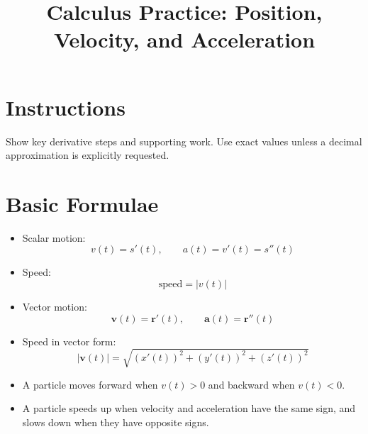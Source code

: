 \documentclass[12pt]{article}
\title{Calculus Practice: Position, Velocity, and Acceleration}
\author{}
\date{}
\begin{document}
\maketitle

\section*{Instructions}
Show key derivative steps and supporting work. Use exact values unless a decimal approximation is explicitly requested.

\section*{Basic Formulae}
\begin{itemize}[leftmargin=1.5em]
  \item Scalar motion:
  \[
  v(t)=s'(t),\qquad a(t)=v'(t)=s''(t)
  \]
  \item Speed:
  \[
  \text{speed}=|v(t)|
  \]
  \item Vector motion:
  \[
  \mathbf{v}(t)=\mathbf{r}'(t),\qquad \mathbf{a}(t)=\mathbf{r}''(t)
  \]
  \item Speed in vector form:
  \[
  |\mathbf{v}(t)|=\sqrt{(x'(t))^2+(y'(t))^2+(z'(t))^2}
  \]
  \item A particle moves forward when $v(t)>0$ and backward when $v(t)<0$.
  \item A particle speeds up when velocity and acceleration have the same sign, and slows down when they have opposite signs.
\end{itemize}
\end{document}
